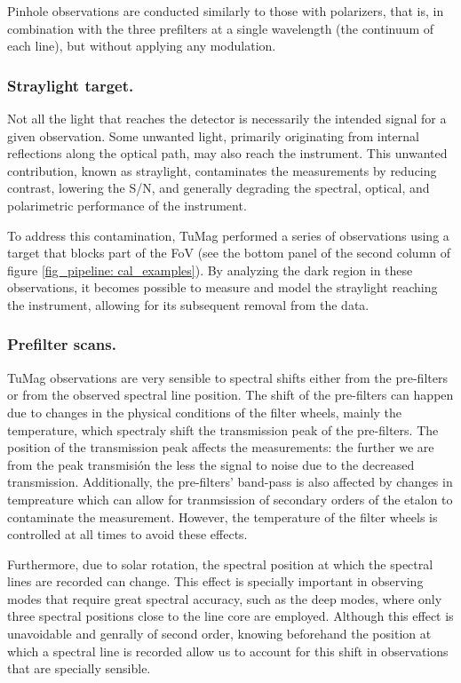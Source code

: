 Pinhole observations are conducted similarly to those with polarizers, that is, in combination with the three prefilters at a single wavelength (the continuum of each line), but without applying any modulation.

\subsubsection{Straylight target.}

Not all the light that reaches the detector is necessarily the intended signal for a given observation. Some unwanted light, primarily originating from internal reflections along the optical path, may also reach the instrument. This unwanted contribution, known as straylight, contaminates the measurements by reducing contrast, lowering the S/N, and generally degrading the spectral, optical, and polarimetric performance of the instrument.

To address this contamination, TuMag performed a series of observations using a target that blocks part of the FoV (see the bottom panel of the second column of figure \ref{fig_pipeline: cal_examples}). By analyzing the dark region in these observations, it becomes possible to measure and model the straylight reaching the instrument, allowing for its subsequent removal from the data.

\subsubsection{\label{ref:spectral_scans}Prefilter scans.}

TuMag observations are very sensible to spectral shifts either from the pre-filters or from the observed spectral line position. The shift of the pre-filters can happen due to changes in the physical conditions of the filter wheels, mainly the temperature, which spectraly shift the transmission peak of the pre-filters. The position of the transmission peak affects the measurements: the further we are from the peak transmisión the less the signal to noise due to the decreased transmission. Additionally, the pre-filters' band-pass is also affected by changes in tempreature which can allow for tranmsission of secondary orders of the etalon to contaminate the measurement. However, the temperature of the filter wheels is controlled at all times to avoid these effects.

Furthermore, due to solar rotation, the spectral position at which the spectral lines are recorded can change. This effect is specially important in observing modes that require great spectral accuracy, such as the deep modes, where only three spectral positions close to the line core are employed. Although this effect is unavoidable and genrally of second order, knowing beforehand the position at which a spectral line is recorded allow us to account for this shift in observations that are specially sensible.  

